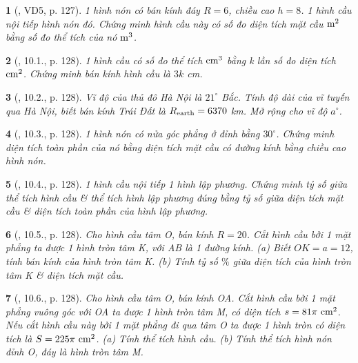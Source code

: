 \documentclass{article}
\newtheorem{baitoan}{}
\begin{document}
\begin{baitoan}[\cite{Binh_boi_duong_Toan_9_tap_2}, VD5, p. 127]
	1 hình nón có bán kính đáy $R = 6$, chiều cao $h = 8$. 1 hình cầu nội tiếp hình nón đó. Chứng minh hình cầu này có số đo diện tích mặt cầu $\rm m^2$ bằng số đo thể tích của nó $\rm m^3$.
\end{baitoan}

\begin{baitoan}[\cite{Binh_boi_duong_Toan_9_tap_2}, 10.1., p. 128]
	1 hình cầu có số đo thể tích $\rm cm^3$ bằng k lần số đo diện tích $\rm cm^2$. Chứng minh bán kính hình cầu là $3k$ {\rm cm}.
\end{baitoan}

\begin{baitoan}[\cite{Binh_boi_duong_Toan_9_tap_2}, 10.2., p. 128]
	Vĩ độ của thủ đô Hà Nội là $21^\circ$ Bắc. Tính độ dài của vĩ tuyến qua Hà Nội, biết bán kính Trái Đất là $R_{\rm earth} = 6370$ {\rm km}. Mở rộng cho vĩ độ $a^\circ$.
\end{baitoan}

\begin{baitoan}[\cite{Binh_boi_duong_Toan_9_tap_2}, 10.3., p. 128]
	1 hình nón có nửa góc phẳng ở đỉnh bằng $30^\circ$. Chứng minh diện tích toàn phần của nó bằng diện tích mặt cầu có đường kính bằng chiều cao hình nón.
\end{baitoan}

\begin{baitoan}[\cite{Binh_boi_duong_Toan_9_tap_2}, 10.4., p. 128]
	1 hình cầu nội tiếp 1 hình lập phương. Chứng minh tỷ số giữa thể tích hình cầu \& thể tích hình lập phương đúng bằng tỷ số giữa diện tích mặt cầu \& diện tích toàn phần của hình lập phương.
\end{baitoan}

\begin{baitoan}[\cite{Binh_boi_duong_Toan_9_tap_2}, 10.5., p. 128]
	Cho hình cầu tâm O, bán kính $R = 20$. Cắt hình cầu bởi 1 mặt phẳng ta được 1 hình tròn tâm K, với AB là 1 đường kính. (a) Biết $OK = a = 12$, tính bán kính của hình tròn tâm K. (b) Tính tỷ số $\%$ giữa diện tích của hình tròn tâm K \& diện tích mặt cầu.
\end{baitoan}

\begin{baitoan}[\cite{Binh_boi_duong_Toan_9_tap_2}, 10.6., p. 128]
	Cho hình cầu tâm O, bán kính OA. Cắt hình cầu bởi 1 mặt phẳng vuông góc với OA ta được 1 hình tròn tâm M, có diện tích $s = 81\pi\ {\rm cm}^2$. Nếu cắt hình cầu này bởi 1 mặt phẳng đi qua tâm O ta được 1 hình tròn có diện tích là $S = 225\pi\ {\rm cm}^2$. (a) Tính thể tích hình cầu. (b) Tính thể tích hình nón đỉnh O, đáy là hình tròn tâm M.
\end{baitoan}
\end{document}
